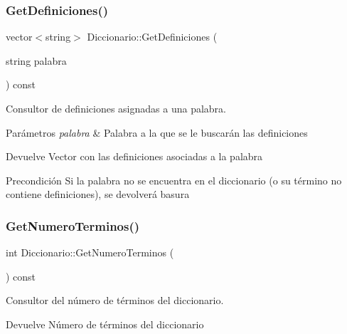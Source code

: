 \subsubsection{\texorpdfstring{Get\+Definiciones()}{GetDefiniciones()}}
{\footnotesize\ttfamily vector$<$string$>$ Diccionario\+::\+Get\+Definiciones (\begin{DoxyParamCaption}\item[{string}]{palabra }\end{DoxyParamCaption}) const}



Consultor de definiciones asignadas a una palabra. 


\begin{DoxyParams}{Parámetros}
{\em palabra} & Palabra a la que se le buscarán las definiciones \\
\hline
\end{DoxyParams}
\begin{DoxyReturn}{Devuelve}
Vector con las definiciones asociadas a la palabra 
\end{DoxyReturn}
\begin{DoxyPrecond}{Precondición}
Si la palabra no se encuentra en el diccionario (o su término no contiene definiciones), se devolverá basura 
\end{DoxyPrecond}
\mbox{\label{classDiccionario_a52ee9ad6a4b58befe9c3603e405cb360}} 
\subsubsection{\texorpdfstring{Get\+Numero\+Terminos()}{GetNumeroTerminos()}}
{\footnotesize\ttfamily int Diccionario\+::\+Get\+Numero\+Terminos (\begin{DoxyParamCaption}{ }\end{DoxyParamCaption}) const}



Consultor del número de términos del diccionario. 

\begin{DoxyReturn}{Devuelve}
Número de términos del diccionario 
\end{DoxyReturn}
\mbox{\label{classDiccionario_a63099f1e3380fe0ba0a69eadb89adb32}} 
